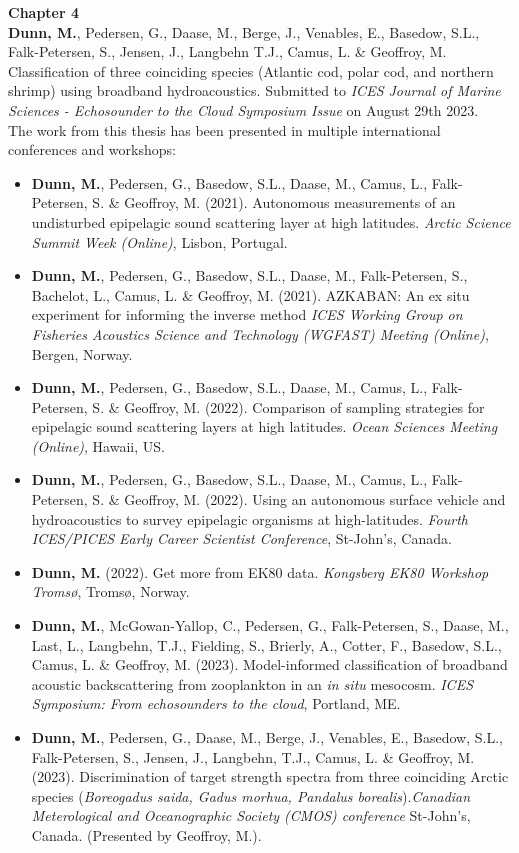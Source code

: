\textbf{Chapter 4}
\\
\textbf{Dunn, M.}, Pedersen, G., Daase, M., Berge, J., Venables, E., Basedow, S.L., Falk-Petersen, S., Jensen, J., Langbehn T.J.,  Camus, L. \& Geoffroy, M. Classification of three coinciding species (Atlantic cod, polar cod, and northern shrimp) using broadband hydroacoustics. Submitted to \textit{ICES Journal of Marine Sciences - Echosounder to the Cloud Symposium Issue} on August 29th 2023. 
\\
The work from this thesis has been presented in multiple international conferences and workshops:
\begin{itemize}
\item \textbf{Dunn, M.}, Pedersen, G., Basedow, S.L., Daase, M., Camus, L., Falk-Petersen, S. \& Geoffroy, M. (2021). Autonomous measurements of an undisturbed epipelagic sound scattering layer at high latitudes. \textit{Arctic Science Summit Week (Online)}, Lisbon, Portugal.
\item \textbf{Dunn, M.}, Pedersen, G., Basedow, S.L., Daase, M., Falk-Petersen, S., Bachelot, L., Camus, L. \& Geoffroy, M. (2021). AZKABAN: An ex situ experiment for informing the inverse method \textit{ICES Working Group on Fisheries Acoustics Science and Technology (WGFAST) Meeting (Online)}, Bergen, Norway.
\item \textbf{Dunn, M.}, Pedersen, G., Basedow, S.L., Daase, M., Camus, L., Falk-Petersen, S. \& Geoffroy, M. (2022). Comparison of sampling strategies for epipelagic sound scattering layers at high latitudes. \textit{Ocean Sciences Meeting (Online)}, Hawaii, US.
\item \textbf{Dunn, M.}, Pedersen, G., Basedow, S.L., Daase, M., Camus, L., Falk-Petersen, S. \& Geoffroy, M. (2022). Using an autonomous surface vehicle and hydroacoustics to survey epipelagic organisms at high-latitudes. \textit{ Fourth ICES/PICES Early Career Scientist Conference}, St-John's, Canada.
\item \textbf{Dunn, M.} (2022). Get more from EK80 data. \textit{Kongsberg EK80 Workshop Tromsø}, Tromsø, Norway. 
\item \textbf{Dunn, M.}, McGowan-Yallop, C., Pedersen, G., Falk-Petersen, S., Daase, M.,  Last, L., Langbehn, T.J., Fielding, S., Brierly, A., Cotter, F., Basedow, S.L., Camus, L. \& Geoffroy, M. (2023). Model-informed classification of broadband acoustic backscattering from zooplankton in an \textit{in situ} mesocosm. \textit{ICES Symposium: From echosounders to the cloud}, Portland, ME.
\item \textbf{Dunn, M.}, Pedersen, G., Daase, M., Berge, J., Venables, E., Basedow, S.L., Falk-Petersen, S., Jensen, J., Langbehn, T.J.,  Camus, L. \& Geoffroy, M. (2023). Discrimination of target strength spectra from three coinciding Arctic species (\textit{Boreogadus saida, Gadus morhua, Pandalus borealis}).\textit{Canadian Meterological and Oceanographic Society (CMOS) conference} St-John’s, Canada. (Presented by Geoffroy, M.).
\end{itemize}



